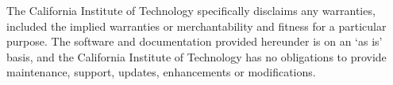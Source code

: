 The California Institute of Technology specifically disclaims any warranties,
included the implied warranties or merchantability and fitness for a particular
purpose.  The software and documentation provided hereunder is on an `as is'
basis, and the California Institute of Technology has no obligations to provide
maintenance, support, updates, enhancements or modifications.
